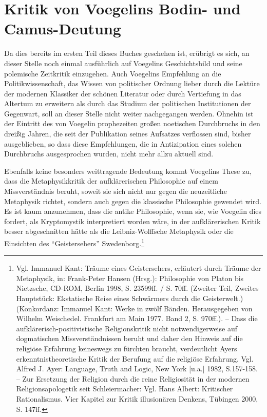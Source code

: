 \section{Kritik von Voegelins Bodin- und Camus-Deu\-tung}

Da dies bereits im ersten Teil dieses Buches geschehen ist, erübrigt es sich,
an dieser Stelle noch einmal ausführlich auf Voegelins Geschichtsbild und
seine polemische Zeitkritik einzugehen. Auch Voegelins Empfehlung an die
Politikwissenschaft, das Wissen von politischer Ordnung lieber durch die
Lektüre der modernen Klassiker der schönen Literatur oder durch Vertiefung in
das Altertum zu erweitern als durch das Studium der politischen Institutionen
der Gegenwart, soll an dieser Stelle nicht weiter nachgegangen werden.
Ohnehin ist der Eintritt des von Voegelin prophezeiten großen noetischen
Durchbruchs in den dreißig Jahren, die seit der Publikation seines Aufsatzes
verflossen sind, bisher ausgeblieben, so dass diese Empfehlungen, die in
Antizipation eines solchen Durchbruchs ausgesprochen wurden, nicht
mehr allzu aktuell sind.

Ebenfalls keine besonders weittragende Bedeutung kommt Voegelins These zu,
dass die Metaphysikkritik der aufklärerischen Philosophie auf einem
Missverständnis beruht, soweit sie sich nicht nur gegen die neuzeitliche
Metaphysik richtet, sondern auch gegen die klassische Philosophie gewendet
wird. Es ist kaum anzunehmen, dass die antike Philosophie, wenn sie, wie
Voegelin dies fordert, als Kryptomystik interpretiert worden wäre, in der
aufklärerischen Kritik besser abgeschnitten hätte als die Leibniz-Wolffsche
Metaphysik oder die Einsichten des "`Geistersehers"' Swedenborg.\footnote{Vgl.
  Immanuel Kant: Träume eines Geistersehers, erläutert durch Träume der
  Metaphysik, in: Frank-Peter Hansen (Hrsg.): Philosophie von Platon bis
  Nietzsche, CD-ROM, Berlin 1998, S. 23599ff. / S. 70ff. (Zweiter Teil,
  Zweites Hauptstück: Ekstatische Reise eines Schwärmers durch die
  Geisterwelt.) (Konkordanz: Immanuel Kant: Werke in zwölf Bänden.
  Herausgegeben von Wilhelm Weischedel.  Frankfurt am Main 1977. Band 2, S.
  970ff.). -- Dass die aufklärerisch-positivistische Religionskritik nicht
  notwendigerweise auf dogmatischen Missverständnissen beruht und daher den
  Hinweis auf die religiöse Erfahrung keineswegs zu fürchten braucht,
  verdeutlicht Ayers erkenntnistheoretische Kritik der Berufung auf die
  religiöse Erfahrung. Vgl.  Alfred J. Ayer: Language, Truth and Logic, New
  York [u.a.]  1982, S.157-158.  -- Zur Ersetzung der Religion durch die reine
  Religiosität in der modernen Religionsapologetik seit Schleiermacher: Vgl.
  Hans Albert: Kritischer Rationalismus. Vier Kapitel zur Kritik illusionären
  Denkens, Tübingen 2000, S. 147ff.}

